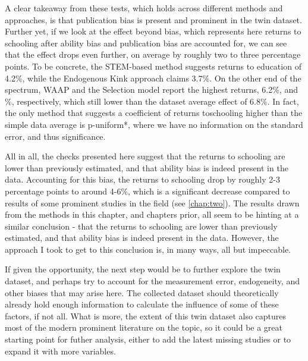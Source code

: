 A clear takeaway from these tests, which holds across different methods and approaches, is that publication bias is present and prominent in the twin dataset. Further yet, if we look at the effect beyond bias, which represents here returns to schooling after ability bias and publication bias are accounted for, we can see that the effect drops even further, on average by roughly two to three percentage points. To be concrete, the STEM-based method suggests returns to education of 4.2\%, while the Endogenous Kink approach claims 3.7\%. On the other end of the spectrum, \ac{WAAP} and the Selection model report the highest returns, 6.2\%, and \%, respectively, which still lower than the dataset average effect of 6.8\%. In fact, the only method that suggests a coefficient of returns toschooling higher than the simple data average is p-uniform*, where we have no information on the standard error, and thus significance.

All in all, the checks presented here suggest that the returns to schooling are lower than previously estimated, and that ability bias is indeed present in the data. Accounting for this bias, the returns to schooling drop by roughly 2-3 percentage points to around 4-6\%, which is a significant decrease compared to results of some prominent studies in the field (see \autoref{chap:two}). The results drawn from the methods in this chapter, and chapters prior, all seem to be hinting at a similar conclusion - that the returns to schooling are lower than previously estimated, and that ability bias is indeed present in the data. However, the approach I took to get to this conclusion is, in many ways, all but impeccable.

If given the opportunity, the next step would be to further explore the twin dataset, and perhaps try to account for the measurement error, endogeneity, and other biases that may arise here. The collected dataset should theoretically already hold enough information to calculate the influence of some of these factors, if not all. What is more, the extent of this twin dataset also captures most of the modern prominent literature on the topic, so it could be a great starting point for futher analysis, either to add the latest missing studies or to expand it with more variables.

